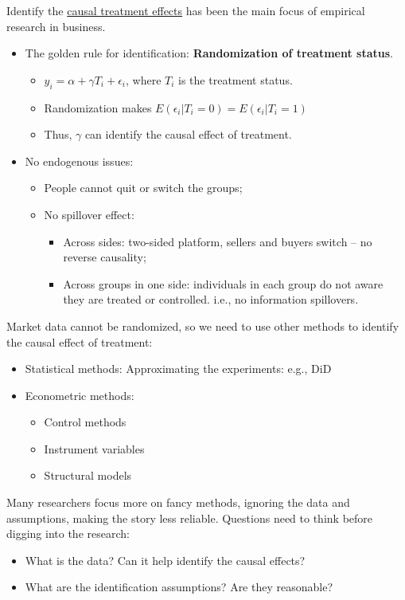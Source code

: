 \documentclass[12pt, a4paper]{article}
\begin{document}
\newpage

Identify the \underline{causal treatment effects} has been the main focus of empirical research in business.
\begin{itemize}
    \item The golden rule for identification: \textbf{Randomization of treatment status}.
    \begin{itemize}
        \item $y_i = \alpha + \gamma T_i + \epsilon_i$, where $T_i$ is the treatment status.
        \item Randomization makes $E(\epsilon_i | T_i = 0) = E(\epsilon_i | T_i = 1)$
        \item Thus, $\gamma$ can identify the causal effect of treatment.
    \end{itemize}
        \item No endogenous issues: 
    \begin{itemize}
        \item People cannot quit or switch the groups;
        \item No spillover effect:
        \begin{itemize}
            \item Across sides: two-sided platform, sellers and buyers switch -- no reverse causality;
            \item Across groups in one side: individuals in each group do not aware they are treated or controlled. i.e., no information spillovers.
        \end{itemize}
    \end{itemize}
\end{itemize}

Market data cannot be randomized, so we need to use other methods to identify the causal effect of treatment:

\begin{itemize}
    \item Statistical methods: Approximating the experiments: e.g., DiD
    \item Econometric methods:
    \begin{itemize}
        \item Control methods
        \item Instrument variables
        \item Structural models
    \end{itemize}
\end{itemize}

Many researchers focus more on fancy methods, ignoring the data and assumptions, making the story less reliable. Questions need to think before digging into the research:
\begin{itemize}
    \item What is the data? Can it help identify the causal effects?
    \item What are the identification assumptions? Are they reasonable?
\end{itemize}
\end{document}
